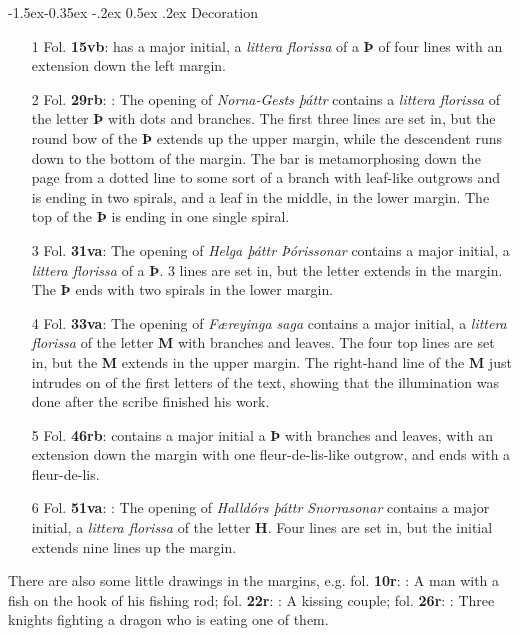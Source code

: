 \documentclass[11pt,twoside]{article}\makeatletter
\makeatletter
\renewcommand\subsubsection{\@startsection{subsubsection}{3}{\z@}%
     {-1.5ex\@plus -0.35ex \@minus -.2ex}%
     {0.5ex \@plus .2ex}%
     {\reset@font\large\sffamily}}
\makeatother
\begin{document}
\subsubsection{Decoration}
\par
\begin{itemize}
\item[1] Fol. \textbf{15vb}:  has a major initial, a \textit{littera florissa} of a {\bfseries Þ} of four lines with an extension down the left margin.
\item[2] Fol. \textbf{29rb}: : The opening of \textit{Norna-Gests þáttr} contains a \textit{littera florissa} of the letter {\bfseries Þ} with dots and branches. The first three lines are set in, but the round bow of the {\bfseries Þ} extends up the upper margin, while the descendent runs down to the bottom of the margin. The bar is metamorphosing down the page from a dotted line to some sort of a branch with leaf-like outgrows and is ending in two spirals, and a leaf in the middle, in the lower margin. The top of the {\bfseries Þ} is ending in one single spiral.
\item[3] Fol. \textbf{31va}: The opening of \textit{Helga þáttr Þórissonar} contains a major initial, a \textit{littera florissa} of a {\bfseries Þ}. 3 lines are set in, but the letter extends in the margin. The {\bfseries Þ} ends with two spirals in the lower margin.
\item[4] Fol. \textbf{33va}: The opening of \textit{Færeyinga saga} contains a major initial, a \textit{littera florissa} of the letter {\bfseries M} with branches and leaves. The four top lines are set in, but the {\bfseries M} extends in the upper margin. The right-hand line of the {\bfseries M} just intrudes on of the first letters of the text, showing that the illumination was done after the scribe finished his work.
\item[5] Fol. \textbf{46rb}: contains a major initial a {\bfseries Þ} with branches and leaves, with an extension down the margin with one fleur-de-lis-like outgrow, and ends with a fleur-de-lis.
\item[6] Fol. \textbf{51va}: : The opening of \textit{Halldórs þáttr Snorrasonar} contains a major initial, a \textit{littera florissa} of the letter {\bfseries H}. Four lines are set in, but the initial extends nine lines up the margin.
\end{itemize}  \par
There are also some little drawings in the margins, e.g. fol. \textbf{10r}: : A man with a fish on the hook of his fishing rod; fol. \textbf{22r}: : A kissing couple; fol. \textbf{26r}: : Three knights fighting a dragon who is eating one of them.\par
\end{document}
